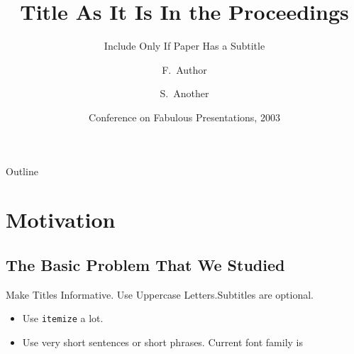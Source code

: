 \documentclass[aspectratio=169]{beamer}
\title[Short Paper Title] %
{Title As It Is In the Proceedings}
\subtitle
{Include Only If Paper Has a Subtitle}
\author[Author, Another] %
{F.~Author\inst{1} \and S.~Another\inst{2}}
\institute[Universities of Somewhere and Elsewhere] %
{
  \inst{1}%
  Department of Computer Science\\
  University of Somewhere
  \and
  \inst{2}%
  Department of Theoretical Philosophy\\
  University of Elsewhere}
\date[CFP 2003] %
{Conference on Fabulous Presentations, 2003}
\begin{document}
\begin{frame}
    \titlepage
\end{frame}

\begin{frame}{Outline}
    \tableofcontents
\end{frame}





\section{Motivation}

\subsection{The Basic Problem That We Studied}

\begin{frame}{Make Titles Informative. Use Uppercase Letters.}{Subtitles are optional.}

    \begin{itemize}
        \item
              Use \texttt{itemize} a lot.
        \item
              Use very short sentences or short phrases. Current font family is \familydefault
    \end{itemize}
\end{frame}
\end{document}
